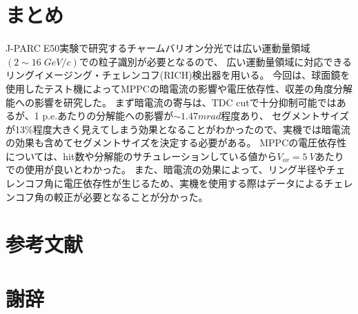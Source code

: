 \documentclass[uplatex, titlepage, dvipdfmx, 12pt, a4paper]{jsreport}
\begin{document}
\chapter{まとめ}
    J-PARC$\;$E50実験で研究するチャームバリオン分光では広い運動量領域$\left(2\sim16\;\si{GeV/c}\right)$での粒子識別が必要となるので、
    広い運動量領域に対応できるリングイメージング・チェレンコフ(RICH)検出器を用いる。
    今回は、球面鏡を使用したテスト機によってMPPCの暗電流の影響や電圧依存性、収差の角度分解能への影響を研究した。
    まず暗電流の寄与は、TDC cutで十分抑制可能ではあるが、1 p.e.あたりの分解能への影響が$\sim1.47\si{mrad}$程度あり、
    セグメントサイズが13\%程度大きく見えてしまう効果となることがわかったので、実機では暗電流の効果も含めてセグメントサイズを決定する必要がある。
    MPPCの電圧依存性については、hit数や分解能のサチュレーションしている値から$V_{ov}=\SI{5}{V}$あたりでの使用が良いとわかった。
    また、暗電流の効果によって、リング半径やチェレンコフ角に電圧依存性が生じるため、実機を使用する際はデータによるチェレンコフ角の較正が必要となることが分かった。

\chapter{参考文献}

\chapter{謝辞}
\end{document}
